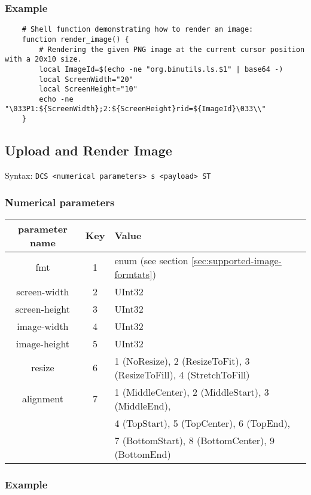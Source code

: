 \documentclass[a4paper]{article}
\newcommand{\code}[1]{\colorbox{light-gray}{\texttt{#1}}}
\begin{document}
\subsubsection*{Example}

\begin{verbatim}
    # Shell function demonstrating how to render an image:
    function render_image() {
        # Rendering the given PNG image at the current cursor position with a 20x10 size.
        local ImageId=$(echo -ne "org.binutils.ls.$1" | base64 -)
        local ScreenWidth="20"
        local ScreenHeight="10"
        echo -ne "\033P1:${ScreenWidth};2:${ScreenHeight}rid=${ImageId}\033\\"
    }
\end{verbatim}

\subsection{Upload and Render Image} %

Syntax: \code{DCS <numerical parameters> s <payload> ST}

\subsubsection*{Numerical parameters}

\begin{tabular}{ |c|c|l| }
    \hline
    \textbf{parameter name}   & \textbf{Key} & \textbf{Value} \\
    \hline
    fmt         & 1   & enum (see section \ref{sec:supported-image-formtats}) \\
    screen-width  & 2   & UInt32 \\
    screen-height & 3   & UInt32 \\
    image-width & 4   & UInt32 \\
    image-height& 5   & UInt32 \\
    resize      & 6   & 1 (NoResize), 2 (ResizeToFit), 3 (ResizeToFill), 4 (StretchToFill) \\
    alignment   & 7   & 1 (MiddleCenter), 2 (MiddleStart), 3 (MiddleEnd), \\
                &     & 4 (TopStart), 5 (TopCenter), 6 (TopEnd), \\
                &     & 7 (BottomStart), 8 (BottomCenter), 9 (BottomEnd) \\
    \hline
\end{tabular}

\subsubsection*{Example}
\end{document}

